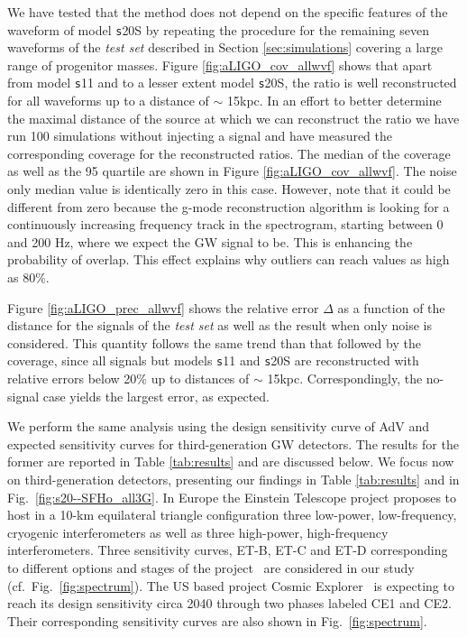 We have tested that the method does not depend on the specific features of the waveform of model {\texttt s20S} by repeating the procedure for the remaining seven waveforms of the {\it test set} described in Section \ref{sec:simulations} covering
a large range of progenitor masses. Figure \ref{fig:aLIGO_cov_allwvf} shows that apart from model {\texttt s11} and to a lesser extent model {\texttt s20S}, the ratio is well reconstructed for all waveforms up to a distance of $\sim$ 15kpc. In an
effort to better determine the maximal distance of the source at which we can reconstruct the ratio we have run 100 simulations without injecting a signal and have measured the corresponding coverage for the reconstructed ratios.
The median of the coverage as well as the 95 quartile are shown in Figure \ref{fig:aLIGO_cov_allwvf}. 
The noise only median value is identically zero in this case. However, note that it could be different from zero because
the g-mode reconstruction algorithm is looking for a continuously  increasing frequency track
in the spectrogram, starting between 0 and 200 Hz, where we expect the GW signal to be.
This is enhancing the probability of overlap. This effect explains why outliers can reach
values as high as 80\%. 

Figure \ref{fig:aLIGO_prec_allwvf} shows the relative error $\Delta$ as a function of the distance for the signals of the {\it test set}
as well as the result when only noise is considered. This quantity follows the same trend than that followed by the coverage, since all signals but models {\texttt s11} and {\texttt s20S} are reconstructed with relative errors below 20\% up to distances of $\sim$ 15kpc. Correspondingly, the no-signal case yields the largest error, as expected.

We perform the same analysis using the design sensitivity curve of AdV and expected sensitivity curves for third-generation 
GW detectors. The results for the former are reported in Table \ref{tab:results} and are discussed below. We focus now on third-generation detectors, presenting our findings in Table \ref{tab:results} and in Fig.~\ref{fig:s20--SFHo_all3G}. In Europe the Einstein Telescope project proposes to host in a 10-km equilateral triangle configuration three low-power, low-frequency, cryogenic interferometers as well as three high-power, high-frequency interferometers. Three sensitivity curves, ET-B, ET-C and ET-D corresponding to different options and stages of the project~\cite{Hild_2011} are considered in our study (cf.~Fig.~\ref{fig:spectrum}). The US based project Cosmic Explorer~\cite{reitze2019cosmic} is expecting to reach its design
sensitivity circa 2040 through two phases labeled CE1 and CE2. Their corresponding sensitivity curves are also shown in Fig.~\ref{fig:spectrum}. 

